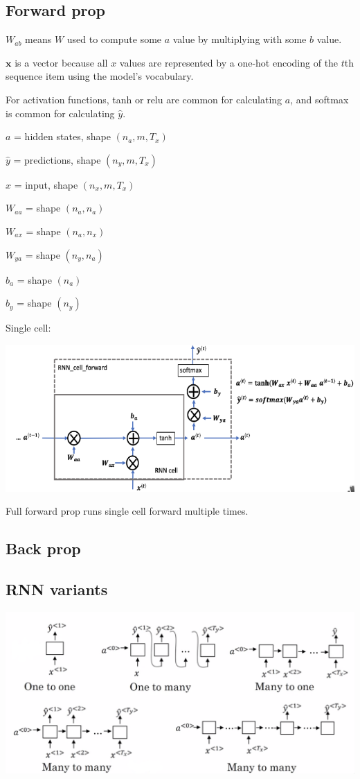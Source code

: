 \documentclass[12pt]{article}
\begin{document}
\subsection{Forward prop}

$W_{ab}$ means $W$ used to compute some $a$ value by multiplying with some $b$ value.

$\bm x$ is a vector because all $x$ values are represented by a one-hot encoding of the $t$th
sequence item using the model's vocabulary.

For activation functions, tanh or relu are common for calculating $a$, and softmax is common
for calculating $\hat y$.

$a$ = hidden states, shape $(n_a, m, T_x)$

$\hat y$ = predictions, shape $(n_y, m, T_x)$

$x$ = input, shape $(n_x, m, T_x)$

$W_{aa}$ = shape $(n_a, n_a)$

$W_{ax}$ = shape $(n_a, n_x)$

$W_{ya}$ = shape $(n_y, n_a)$

$b_a$ = shape $(n_a)$

$b_y$ = shape $(n_y)$

Single cell:

\includegraphics[scale=.65]{images/rnn-cell-forward.png}

Full forward prop runs single cell forward multiple times.

\subsection{Back prop}

\subsection{RNN variants}

\includegraphics[scale=1.5]{images/rnn-variants.png}
\end{document}

